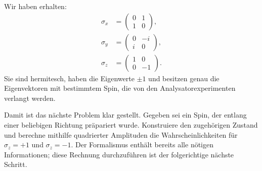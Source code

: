\begin{classroomqa}
\end{classroomqa}

Wir haben erhalten:
\begin{equation}
\begin{aligned}
\sigma_x&=\begin{pmatrix}0&1\\1&0\end{pmatrix},\\[0.4em]
\sigma_y&=\begin{pmatrix}0&-i\\i&0\end{pmatrix},\\[0.4em]
\sigma_z&=\begin{pmatrix}1&0\\0&-1\end{pmatrix}.
\end{aligned}
\label{eq:pauli-triple}
\end{equation}
Sie sind hermitesch, haben die Eigenwerte \(\pm1\) und besitzen genau die Eigenvektoren mit bestimmtem Spin, die von den Analysatorexperimenten verlangt werden.

Damit ist das nächste Problem klar gestellt. Gegeben sei ein Spin, der entlang einer beliebigen Richtung präpariert wurde. Konstruiere den zugehörigen Zustand und berechne mithilfe quadrierter Amplituden die Wahrscheinlichkeiten für \(\sigma_z=+1\) und \(\sigma_z=-1\). Der Formalismus enthält bereits alle nötigen Informationen; diese Rechnung durchzuführen ist der folgerichtige nächste Schritt.
